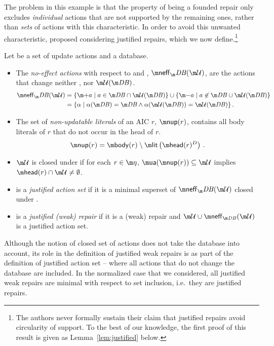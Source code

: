 The problem in this example is that the property of being a founded repair only excludes \emph{individual} actions that are not supported by the remaining ones, rather than \emph{sets} of actions with this characteristic.
In order to avoid this unwanted characteristic, \citet{tplp/CaropreseT11} proposed considering justified repairs, which we now define.\footnote{The authors never formally sustain their claim that justified repairs avoid circularity of support.  To the best of our knowledge, the first proof of this result is given as Lemma~\ref{lem:justified} below.}

\begin{definition}
  Let \UU be a set of update actions and \fulldb a database. 
  \begin{itemize}
   \item The \emph{no-effect actions} with respect to \db and \UU, $\neff_\db(\UU)$, are the actions that change neither \db, nor $\UU(\db)$.
     \begin{align*}\neff_\db(\UU) &= \{\add a\mid a \in \db \cap \UU(\db)\} \cup \{\remove a \mid a \not\in \db \cup \UU(\db)\}\\
       &=\{\alpha \mid \alpha(\db) = \db \land \alpha(\UU(\db))=\UU(\db)\}\,.
     \end{align*}
   \item The set of \emph{non-updatable literals} of an AIC $r$, $\nup(r)$, contains all body literals of $r$ that do not occur in the head of $r$.
     \[\nup(r) = \body(r) \setminus \litof\left(\head(r)^D\right)\,.\]
   \item $\UU$ is closed under \aics if for each $r\in \aics$, $\actof(\nup(r))\subseteq \UU$ implies $\head(r)\cap \UU\neq \emptyset$.
   \item \UU is a \emph{justified action set} if it is a minimal superset of $\neff_\db(\UU)$ closed under \aics.
   \item \UU is a \emph{justified (weak) repair} if it is a (weak) repair and $\UU\cup \neff_{\db}(\UU)$ is a justified action set. 
  \end{itemize}

\end{definition}
Although the notion of closed set of actions does not take the database into account, its role in the definition of justified weak repairs is as part of the definition of justified action set -- where all actions that do not change the database are included.
In the normalized case that we considered, all justified weak repairs are minimal with respect to set inclusion, i.e.~they are justified repairs.

